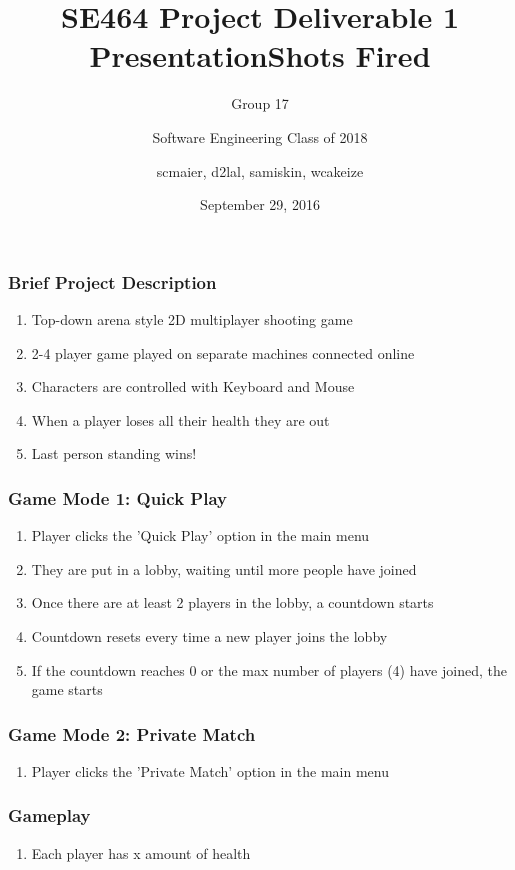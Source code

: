 \documentclass{beamer}
\title%
{SE464 Project Deliverable 1 Presentation}
\subtitle{Group 17}
\author[SE2018] %
{Software Engineering Class of 2018}
\institute[UW] %
{
  University of Waterloo
}
\date%
{September 29, 2016}
\title{Shots Fired}
\author{scmaier, d2lal, samiskin, wcakeize}
\begin{document}
\maketitle
\begin{frame}
\frametitle{Brief Project Description}
\begin{enumerate}
  \item Top-down arena style 2D multiplayer shooting game
  \item 2-4 player game played on separate machines connected online
  \item Characters are controlled with Keyboard and Mouse
  \item When a player loses all their health they are out
  \item Last person standing wins!
\end{enumerate}
\end{frame}

\begin{frame}
\frametitle{Game Mode 1: Quick Play}
\begin{enumerate}
  \item Player clicks the 'Quick Play' option in the main menu
  \item They are put in a lobby, waiting until more people have joined
  \item Once there are at least 2 players in the lobby, a countdown starts
  \item Countdown resets every time a new player joins the lobby
  \item If the countdown reaches 0 or the max number of players (4) have joined, the game starts
\end{enumerate}
\end{frame}

\begin{frame}
\frametitle{Game Mode 2: Private Match}
\begin{enumerate}
  \item Player clicks the 'Private Match' option in the main menu
\end{enumerate}
\end{frame}

\begin{frame}
\frametitle{Gameplay}
\begin{enumerate}
  \item Each player has x amount of health
\end{enumerate}
\end{frame}
\end{document}
